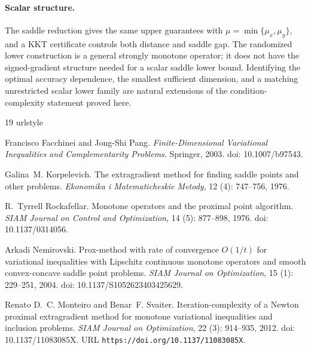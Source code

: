 \documentclass[11pt]{article}
\numberwithin{equation}{section}
\theoremstyle{definition}
\theoremstyle{remark}
\begin{document}
\paragraph{Scalar structure.}
The saddle reduction gives the same upper guarantees with
$\mu=\min\{\mu_x,\mu_y\}$, and a KKT certificate controls both distance
and saddle gap. The randomized lower construction is a general
strongly monotone operator; it does not have the signed-gradient
structure needed for a scalar saddle lower bound. Identifying the
optimal accuracy dependence, the smallest sufficient dimension, and a
matching unrestricted scalar lower family are natural extensions of
the condition-complexity statement proved here.

\begingroup
\small
\setlength{\bibsep}{2pt plus 1pt minus 1pt}
\begin{thebibliography}{19}
\providecommand{\natexlab}[1]{#1}
\providecommand{\url}[1]{\texttt{#1}}
\expandafter\ifx\csname urlstyle\endcsname\relax
  \providecommand{\doi}[1]{doi: #1}\else
  \providecommand{\doi}{doi: \begingroup \urlstyle{rm}\Url}\fi

Francisco Facchinei and Jong-Shi Pang.
\newblock \emph{Finite-Dimensional Variational Inequalities and Complementarity
  Problems}.
\newblock Springer, 2003.
\newblock \doi{10.1007/b97543}.

Galina~M. Korpelevich.
\newblock The extragradient method for finding saddle points and other
  problems.
\newblock \emph{Ekonomika i Matematicheskie Metody}, 12 (4):
  747--756, 1976.

R.~Tyrrell Rockafellar.
\newblock Monotone operators and the proximal point algorithm.
\newblock \emph{SIAM Journal on Control and Optimization}, 14
  (5): 877--898, 1976.
\newblock \doi{10.1137/0314056}.

Arkadi Nemirovski.
\newblock Prox-method with rate of convergence {$O(1/t)$} for variational
  inequalities with {Lipschitz} continuous monotone operators and smooth
  convex-concave saddle point problems.
\newblock \emph{SIAM Journal on Optimization}, 15 (1):
  229--251, 2004.
\newblock \doi{10.1137/S1052623403425629}.

Renato D.~C. Monteiro and Benar~F. Svaiter.
\newblock Iteration-complexity of a {Newton} proximal extragradient method for
  monotone variational inequalities and inclusion problems.
\newblock \emph{SIAM Journal on Optimization}, 22 (3):
  914--935, 2012.
\newblock \doi{10.1137/11083085X}.
\newblock URL \url{https://doi.org/10.1137/11083085X}.


\end{thebibliography}
\end{document}
